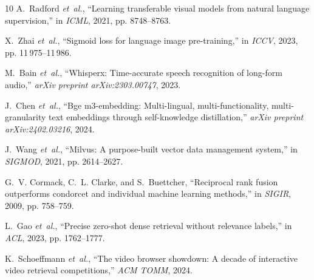 \documentclass[10pt,a4paper,twocolumn]{article}
\begin{document}
\begin{thebibliography}{10}
A.~Radford \emph{et~al.}, ``Learning transferable visual models from natural language supervision,'' in \emph{ICML}, 2021, pp. 8748--8763.

X.~Zhai \emph{et~al.}, ``Sigmoid loss for language image pre-training,'' in \emph{ICCV}, 2023, pp. 11\,975--11\,986.

M.~Bain \emph{et~al.}, ``Whisperx: Time-accurate speech recognition of long-form audio,'' \emph{arXiv preprint arXiv:2303.00747}, 2023.

J.~Chen \emph{et~al.}, ``Bge m3-embedding: Multi-lingual, multi-functionality, multi-granularity text embeddings through self-knowledge distillation,'' \emph{arXiv preprint arXiv:2402.03216}, 2024.

J.~Wang \emph{et~al.}, ``Milvus: A purpose-built vector data management system,'' in \emph{SIGMOD}, 2021, pp. 2614--2627.

G.~V. Cormack, C.~L. Clarke, and S.~Buettcher, ``Reciprocal rank fusion outperforms condorcet and individual machine learning methods,'' in \emph{SIGIR}, 2009, pp. 758--759.

L.~Gao \emph{et~al.}, ``Precise zero-shot dense retrieval without relevance labels,'' in \emph{ACL}, 2023, pp. 1762--1777.

K.~Schoeffmann \emph{et~al.}, ``The video browser showdown: A decade of interactive video retrieval competitions,'' \emph{ACM TOMM}, 2024.
\end{thebibliography}
\end{document}
